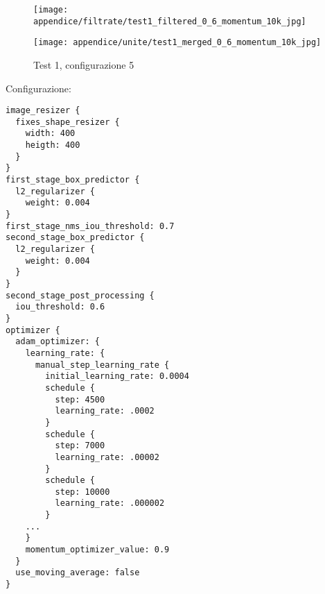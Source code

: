 \newpage
\begin{figure}[H]  
    \begin{minipage}{.5\columnwidth}  
        \centering  
        \texttt{[image: appendice/filtrate/test1\_filtered\_0\_6\_momentum\_10k\_jpg]}  
    \end{minipage}%
    \begin{minipage}{0.5\columnwidth}  
        \centering  
        \texttt{[image: appendice/unite/test1\_merged\_0\_6\_momentum\_10k\_jpg]}  
    \end{minipage}  
    \caption{Test 1, configurazione 5}
\end{figure}%
Configurazione:
\begin{multicols}{2}
    \begin{lstlisting}
image_resizer {
  fixes_shape_resizer {
    width: 400
    heigth: 400
  }
}
first_stage_box_predictor {
  l2_regularizer {
    weight: 0.004
}
first_stage_nms_iou_threshold: 0.7
second_stage_box_predictor {
  l2_regularizer {
    weight: 0.004
  }
}
second_stage_post_processing {
  iou_threshold: 0.6
}
optimizer {
  adam_optimizer: {
    learning_rate: {
      manual_step_learning_rate {
        initial_learning_rate: 0.0004
        schedule {
          step: 4500
          learning_rate: .0002
        }
        schedule {
          step: 7000
          learning_rate: .00002
        }
        schedule {
          step: 10000
          learning_rate: .000002
        }
    ...
    }
    momentum_optimizer_value: 0.9
  }
  use_moving_average: false
}
    \end{lstlisting}
\end{multicols}

